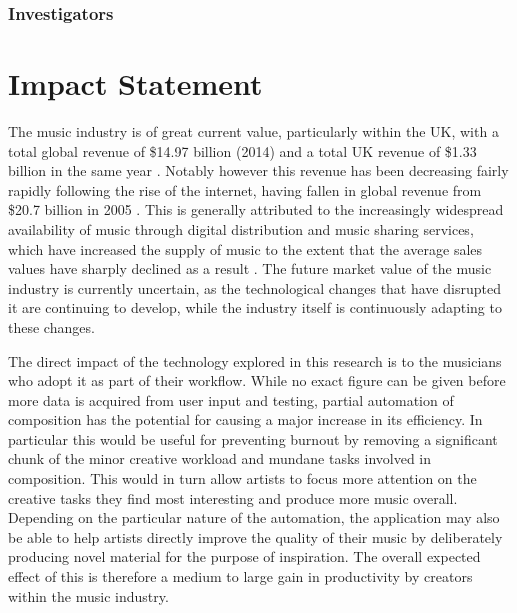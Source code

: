 \documentclass[11pt]{article}
\begin{document}
	\subsubsection{Investigators}
	
	
	
	\pagebreak
	\section{Impact Statement}
	
	
	The music industry is of great current value, particularly within the UK, with a total global revenue of \$14.97 billion (2014) \cite{smirke2015global} and a total UK revenue of \$1.33 billion in the same year \cite{riaj2015global}. Notably however this revenue has been decreasing fairly rapidly following the rise of the internet,  having fallen in global revenue from \$20.7 billion in 2005 \cite[]{ifpi2006digital}. This is generally attributed to the increasingly widespread availability of music through digital distribution and music sharing services, which have increased the supply of music to the extent that the average sales values have sharply declined as a result \cite[]{knopper2009appetite}. The future market value of the music industry is currently uncertain, as the technological changes that have disrupted it are continuing to develop, while the industry itself is continuously adapting to these changes. 
	
	The direct impact of the technology explored in this research is to the musicians who adopt it as part of their workflow. While no exact figure can be given before more data is acquired from user input and testing, partial automation of composition has the potential for causing a major increase in its efficiency. In particular this would be useful for preventing burnout by removing a significant chunk of the minor creative workload and mundane tasks involved in composition. This would in turn allow artists to focus more attention on the creative tasks they find most interesting and produce more music overall. Depending on the particular nature of the automation, the application may also be able to help artists directly improve the quality of their music by deliberately producing novel material for the purpose of inspiration. The overall expected effect of this is therefore a medium to large gain in productivity by creators within the music industry. 
	
\end{document}
